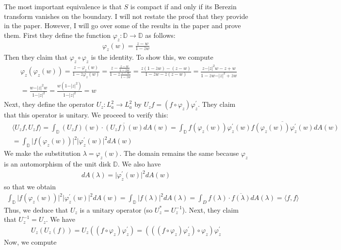 \documentclass[12pt]{article}
\begin{document}
 The most important equivalence is that $S$ is compact if and only if its Berezin transform vanishes on the boundary. I will not restate the proof that they provide in the paper. However, I will go over some of the results in the paper and prove them. First they define the function $\varphi_z: \mathbb{D} \rightarrow \mathbb{D}$ as follows:
\begin{align*}
\varphi_z(w) = \frac{z-w}{1-\overline{z}w}
\end{align*} Then they claim that $\varphi_z \circ \varphi_z$ is the identity. To show this, we compute
\begin{align*}
&\varphi_z(\varphi_z(w)) = \frac{z-\varphi_z(w)}{1-\overline{z}\varphi_z(w)} = \frac{z-\frac{z-w}{1-\overline{z}w}}{1-\overline{z}\frac{z-w}{1-\overline{z}w}} = \frac{z(1-\overline{z}w) - (z-w)}{1-\overline{z}w - \overline{z}(z-w)} = \frac{z - \vert z \vert^2 w - z + w}{1 - \overline{z}w - \vert z \vert^2+ \overline{z}w}  \\ 
& = \frac{w - \vert z \vert^2 w}{1- \vert z \vert^2} = \frac{w(1- \vert z\vert^2)}{1- \vert z \vert^2} = w
\end{align*}
Next, they define the operator $U_z: L_a^2 \rightarrow L_a^2$ by $U_z f = (f \circ \varphi_z) \varphi_z^\prime$. They claim that this operator is unitary. We proceed to verify this:
\begin{align*}
&\langle U_z f, U_zf \rangle = \int_\mathbb{D} (U_z f)(w) \cdot \overline{(U_z f)(w)} dA(w) = \int_\mathbb{D} f(\varphi_z(w))\varphi_z^\prime(w) \overline{f(\varphi_z(w))\varphi_z^\prime(w)} dA(w)\\
&= \int_\mathbb{D} \vert f(\varphi_z(w)) \vert^2 \vert \varphi_z^\prime(w) \vert^2 dA(w)
\end{align*}
 We make the substitution $\lambda = \varphi_z(w)$. The domain remains the same because $\varphi_z$ is an automorphism of the unit disk $\mathbb{D}$. We also have
\begin{align*}
dA(\lambda) = \vert \varphi_z^\prime(w) \vert^2 dA(w)
\end{align*} so that we obtain
\begin{align*}
\int_\mathbb{D} \vert f(\varphi_z(w)) \vert^2 \vert \varphi_z^\prime(w) \vert^2 dA(w) = \int_\mathbb{D} \vert f(\lambda) \vert^2 dA(\lambda) = \int_D f(\lambda) \cdot \overline{f(\lambda)} dA(\lambda) = \langle f, f \rangle
\end{align*} Thus, we deduce that $U_z$ is a unitary operator (so $U_z^* = U_z^{-1}$). Next, they claim that $U_z^{-1} = U_z$. We have
\begin{align*}
U_z(U_z(f)) = U_z((f\circ \varphi_z)\varphi_z^\prime) = (((f \circ \varphi_z)\varphi_z^\prime)\circ \varphi_z) \varphi_z^\prime
\end{align*} Now, we compute
\end{document}
